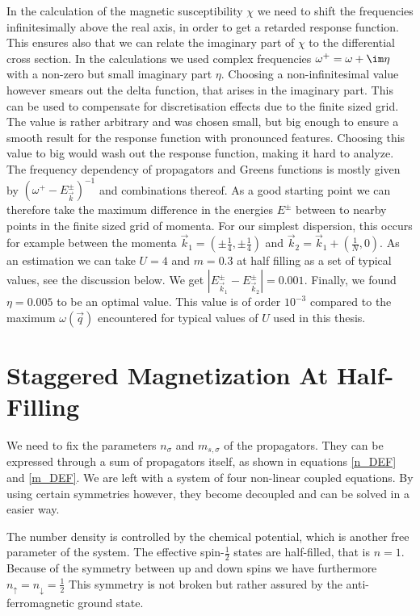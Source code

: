 \documentclass[a4paper,12pt]{report}
\begin{document}
In the calculation of the magnetic susceptibility $\chi$ we need to shift the frequencies infinitesimally above the real axis, 
in order to get a retarded response function. 
This ensures also that we can relate the imaginary part of $\chi$ to the differential cross section. 
In the calculations we used complex frequencies $\omega^+ = \omega + \im \eta$ with a non-zero but small imaginary part $\eta$. 
Choosing a non-infinitesimal value however smears out the delta function, that arises in the imaginary part.
This can be used to compensate for discretisation effects due to the finite sized grid. 
%
The value is rather arbitrary and was chosen small, but big enough to ensure a smooth result for the response function with pronounced features.
Choosing this value to big would wash out the response function, making it hard to analyze.
The frequency dependency of propagators and Greens functions is mostly given by $(\omega^+-E^{\pm}_{\vec k})^{-1}$ and combinations thereof.
As a good starting point we can therefore take the maximum difference in the energies $E^{\pm}$ between to nearby points in the finite sized grid of momenta.
For our simplest dispersion, this occurs for example  between the momenta $\vec k_1 = (\pm \frac14,\pm\frac14)$ and $\vec k_2 = \vec k_1 + (\frac1N,0)$.
As an estimation we can take $U=4$ and $m=0.3$ at half filling as a set of typical values, see the discussion below.
We get $|E^{\pm}_{\vec k_1} - E^{\pm}_{\vec k_2}| = 0.001$.
Finally, we found $\eta=0.005$ to be an optimal value.
This value is of order $10^{-3}$ compared to the maximum $\omega(\vec q)$ encountered for typical values of $U$ used in this thesis.



\section{Staggered Magnetization At Half-Filling}
We need to fix the parameters $n_{\sigma}$ and $m_{s,\sigma}$ of the propagators.
They can be expressed through a sum of propagators itself, as shown in equations \ref{n_DEF} and \ref{m_DEF}.
We are left with a system of four non-linear coupled equations.
By using certain symmetries however, they become decoupled and can be solved in a easier way. 

The number density is controlled by the chemical potential, which is another free parameter of the system.
The effective spin-$\frac12$ states are half-filled, that is $n=1$. 
Because of the symmetry between up and down spins we have furthermore $n_{\uparrow}=n_{\downarrow} = \frac12$
This symmetry is not broken but rather assured by the anti-ferromagnetic ground state.
\end{document}

